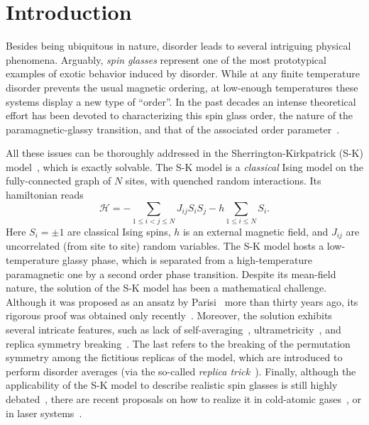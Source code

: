 \documentclass[twocolumn,superscriptaddress,prb,10pt]{revtex4-1}
\begin{document}
\maketitle


\section{Introduction}


Besides being ubiquitous in nature, disorder leads to several intriguing 
physical phenomena. 
Arguably, \emph{spin glasses} represent one of the most prototypical examples
of exotic behavior induced by disorder.
While at any finite temperature disorder prevents the 
usual magnetic ordering, at low-enough temperatures these systems display a 
new type of ``order''. In the past decades an intense theoretical 
effort has been devoted to characterizing this spin glass order, the nature of 
the paramagnetic-glassy transition, and that of the associated order 
parameter~\cite{binder-1986,parisi-book,young-1998,nishimori-book,castellani-2005}. 

All these issues can be thoroughly addressed in the Sherrington-Kirkpatrick 
(S-K) model~\cite{sherrington-1978,sherrington-1978-prl}, which is exactly 
solvable. The S-K model is a \emph{classical} Ising model on the fully-connected 
graph of $N$ sites, with quenched random interactions. Its hamiltonian reads  
%
\begin{equation}
{\mathcal H}=-\sum\limits_{1\le i<j\le N}J_{ij}S_i S_j-
h\sum\limits_{1\le i\le N}S_i.
\label{SK-intro}
\end{equation}
%
Here $S_i=\pm 1$ are classical Ising spins, $h$ is an external magnetic field, and 
$J_{ij}$ are uncorrelated (from site to site) random variables. The S-K model hosts 
a low-temperature glassy phase, which is separated from a high-temperature paramagnetic 
one by a second order phase transition. Despite its mean-field nature, the solution 
of the S-K model has been a mathematical challenge. Although it was proposed as an 
ansatz by Parisi~\cite{parisi-1980} more than thirty years ago, its rigorous proof 
was obtained only recently~\cite{talagrand-2006}. Moreover, the solution exhibits several 
intricate features, such as lack of self-averaging~\cite{pastur-1991}, ultrametricity~\cite{
mezard-1984,rammal-1986}, and replica symmetry breaking~\cite{parisi-book,castellani-2005}. 
The last refers to the breaking of the permutation symmetry among the fictitious replicas 
of the model, which are introduced to perform disorder averages (via the so-called 
\emph{replica trick}~\cite{cardy-book}). Finally, although the applicability of the S-K 
model to describe realistic spin glasses is still highly debated~\cite{yucesoy-2012,
billoire-2012,yucesoy-2013}, there are recent proposals on how to realize it  
in cold-atomic gases~\cite{morrison-2008,rotondo-2015}, or in laser systems~\cite{
ghofraniha-2015}. 
\end{document}
